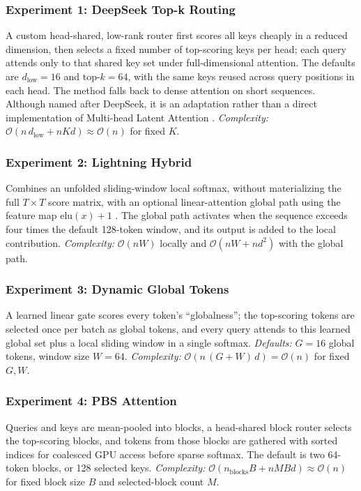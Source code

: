 \documentclass[11pt]{article}
\newcommand{\bigO}{\mathcal{O}}
\begin{document}
\subsubsection*{Experiment 1: DeepSeek Top-k Routing}
\label{exp:deepseek}
A custom head-shared, low-rank router first scores all keys cheaply in a
reduced dimension, then selects a fixed number of top-scoring keys per head;
each query attends only to that shared key set under full-dimensional
attention. The defaults are $d_{\mathrm{low}}=16$ and top-$k=64$, with the
same keys reused across query positions in each head. The method falls back to
dense attention on short sequences. Although named after DeepSeek, it is an
adaptation rather than a direct implementation of Multi-head Latent Attention
\citep{deepseek2024v3}. \emph{Complexity:}
$\bigO(n\,d_{\mathrm{low}}+nKd)\approx\bigO(n)$ for fixed $K$.

\subsubsection*{Experiment 2: Lightning Hybrid}
\label{exp:lightning}
Combines an unfolded sliding-window local softmax, without materializing the
full $T\times T$ score matrix, with an optional linear-attention global path
using the feature map $\mathrm{elu}(x)+1$ \citep{qin2024lightning}. The global
path activates when the sequence exceeds four times the default 128-token
window, and its output is added to the local contribution.
\emph{Complexity:} $\bigO(nW)$ locally and $\bigO(nW+nd^2)$ with the global
path.

\subsubsection*{Experiment 3: Dynamic Global Tokens}
\label{exp:dynglobal}
A learned linear gate scores every token's ``globalness''; the top-scoring
tokens are selected once per batch as global tokens, and every query attends
to this learned global set plus a local sliding window in a single softmax.
\emph{Defaults:} $G=16$ global tokens, window size $W=64$.
\emph{Complexity:} $\bigO(n\,(G+W)\,d) = \bigO(n)$ for fixed $G,W$.

\subsubsection*{Experiment 4: PBS Attention}
\label{exp:pbs}
Queries and keys are mean-pooled into blocks, a head-shared block router
selects the top-scoring blocks, and tokens from those blocks are gathered with
sorted indices for coalesced GPU access before sparse softmax. The default is
two 64-token blocks, or 128 selected keys. \emph{Complexity:}
$\bigO(n_{\mathrm{blocks}}B+nMBd)\approx\bigO(n)$ for fixed block size $B$
and selected-block count $M$.
\end{document}
